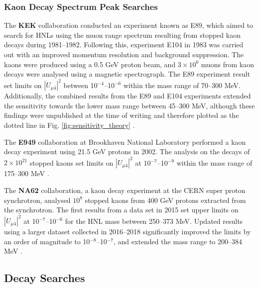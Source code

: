 \subsubsection{Kaon Decay Spectrum Peak Searches}

\begin{coloritemize}
\item The \textbf{KEK} collaboration conducted an experiment known as E89, which aimed to search for HNLs using the muon range spectrum resulting from stopped kaon decays during 1981--1982. 
Following this, experiment E104 in 1983 was carried out with an improved momentum resolution and background suppression.
The kaons were produced using a 0.5 GeV proton beam, and $3 \times 10^{6}$ muons from kaon decays were analysed using a magnetic spectrograph.
The E89 experiment result set limits on $|U_{\mu4}|^{2}$ between 10$^{-4}$--10$^{-6}$ within the mass range of 70--300 MeV.
Additionally, the combined results from the E89 and E104 experiments extended the sensitivity towards the lower mass range between 45--300 MeV, although these findings were unpublished at the time of writing and therefore plotted as the dotted line in Fig. \ref{fig:sensitivity_theory} \cite{KEK1, KEK2, KEK3}.

\item The \textbf{E949} collaboration at Brookhaven National Laboratory performed a kaon decay experiment using 21.5 GeV protons in 2002.
The analysis on the decays of $2 \times 10^{21}$ stopped kaons set limits on $|U_{\mu4}|^{2}$ at 10$^{-7}$--10$^{-9}$ within the mass range of 175--300 MeV \cite{E949}.

\item The \textbf{NA62} collaboration, a kaon decay experiment at the CERN super proton synchrotron, analysed $10^{8}$ stopped kaons from 400 GeV protons extracted from the synchrotron.
The first results from a data set in 2015 set upper limits on $|U_{\mu4}|^{2}$ at 10$^{-7}$--10$^{-6}$ for the HNL mass between 250--373 MeV.
Updated results using a larger dataset collected in 2016--2018 significantly improved the limits by an order of magnitude to 10$^{-8}$--10$^{-7}$, and extended the mass range to 200--384 MeV \cite{NA62A, NA62B}.
\end{coloritemize}

\subsection{Decay Searches}
\label{sec:decaysearch}

